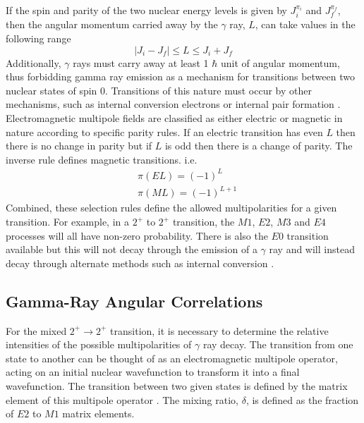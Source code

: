 \documentclass[twocolumn,preprintnumbers,amsmath,amssymb]{revtex4}
\begin{document}
If the spin and parity of the two nuclear energy levels is given by $J^{\pi_i}_{i}$ and $J^{\pi_f}_{f}$, then the angular momentum carried away by the $\gamma$ ray, $L$, can take values in the following range
\begin{equation}
|J_i-J_f|\leq L \leq J_i+J_f
\end{equation}
Additionally, $\gamma$ rays must carry away at least 1 $\hbar$ unit of angular momentum, thus forbidding gamma ray emission as a mechanism for transitions between two nuclear states of spin 0. Transitions of this nature must occur by other mechanisms, such as internal conversion electrons or internal pair formation \cite{evitts_4}. 
Electromagnetic multipole fields are classified as either electric or magnetic in nature according to specific parity rules. If an electric transition has even $L$ then there is no change in parity but if $L$ is odd then there is a change of parity. The inverse rule defines magnetic transitions. i.e.
\begin{equation}
\begin{aligned}
&\pi(EL)=(-1)^{L} \\
&\pi(ML)=(-1)^{L+1}
\label{selectionRules}
\end{aligned}
\end{equation}
Combined, these selection rules define the allowed multipolarities for a given transition. For example, in a $2^+$ to $2^+$ transition, the $M1$, $E2$, $M3$ and $E4$ processes will all have non-zero probability. There is also the $E0$ transition available but this will not decay through the emission of a $\gamma$ ray and will instead decay through alternate methods such as internal conversion \cite{evitts_4}. 

\subsection{Gamma-Ray Angular Correlations}
For the mixed $2^+ \rightarrow 2^+$ transition, it is necessary to determine the relative intensities of the possible multipolarities of $\gamma$ ray decay. The transition from one state to another can be thought of as an electromagnetic multipole operator, acting on an initial nuclear wavefunction to transform it into a final wavefunction. The transition between two given states is defined by the matrix element of this multipole operator \cite{evitts_4}. The mixing ratio, $\delta$, is defined as the fraction of $E2$ to $M1$ matrix elements.
\end{document}

